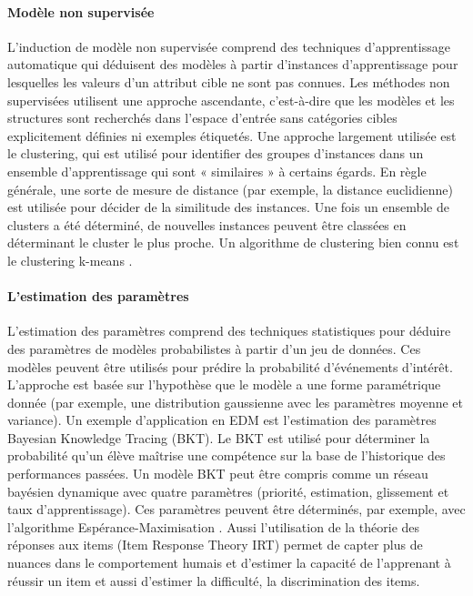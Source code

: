 \paragraph{Modèle non supervisée \\}

L'induction de modèle non supervisée comprend des techniques d'apprentissage automatique qui déduisent des modèles à partir d'instances d'apprentissage pour lesquelles les valeurs d'un attribut cible ne sont pas connues. 
Les méthodes non supervisées utilisent une approche ascendante, c'est-à-dire que les modèles et les structures 
sont recherchés dans l'espace d'entrée sans catégories cibles explicitement définies ni exemples étiquetés. 
Une approche largement utilisée est le clustering, qui est utilisé pour identifier des groupes d'instances dans 
un ensemble d'apprentissage qui sont « similaires » à certains égards. En règle générale, une sorte de mesure de 
distance (par exemple, la distance euclidienne) est utilisée pour décider de la similitude des instances. Une fois un 
ensemble de clusters a été déterminé, de nouvelles instances peuvent être classées en déterminant le cluster le plus 
proche. Un algorithme de clustering bien connu est le clustering k-means \cite{Scheuer2012}.
    
\paragraph{L'estimation des paramètres \\}
L'estimation des paramètres comprend des techniques statistiques pour déduire des paramètres de modèles probabilistes à partir d’un jeu de données. Ces modèles peuvent être utilisés pour prédire la probabilité d'événements d'intérêt. L'approche est basée sur l'hypothèse que le modèle a une forme paramétrique donnée (par exemple, une distribution gaussienne avec les paramètres moyenne et variance). Un exemple d'application en EDM est l'estimation des paramètres Bayesian Knowledge Tracing (BKT). Le BKT est utilisé pour déterminer la probabilité qu'un élève maîtrise une compétence sur la base de l'historique des performances passées. Un modèle BKT peut être compris comme un réseau bayésien dynamique avec quatre paramètres (priorité, estimation, glissement et taux d'apprentissage). Ces paramètres peuvent être déterminés, par exemple, avec l'algorithme Espérance-Maximisation \cite{Scheuer2012}. Aussi l’utilisation de la théorie des réponses aux items (Item Response Theory IRT) permet de capter plus de nuances dans le comportement humais et d’estimer la capacité de l’apprenant à réussir un item et aussi d’estimer la difficulté, la discrimination des items.

